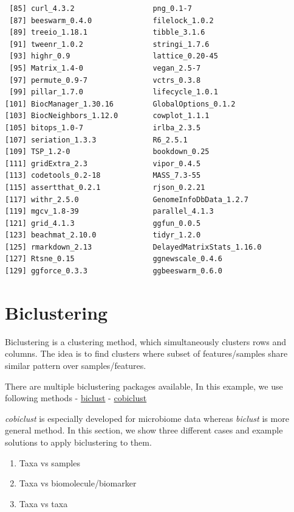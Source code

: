 \documentclass[
]{book}
\providecommand{\tightlist}{%
  \setlength{\itemsep}{0pt}\setlength{\parskip}{0pt}}
\begin{document}
\begin{verbatim}
 [85] curl_4.3.2                  png_0.1-7                  
 [87] beeswarm_0.4.0              filelock_1.0.2             
 [89] treeio_1.18.1               tibble_3.1.6               
 [91] tweenr_1.0.2                stringi_1.7.6              
 [93] highr_0.9                   lattice_0.20-45            
 [95] Matrix_1.4-0                vegan_2.5-7                
 [97] permute_0.9-7               vctrs_0.3.8                
 [99] pillar_1.7.0                lifecycle_1.0.1            
[101] BiocManager_1.30.16         GlobalOptions_0.1.2        
[103] BiocNeighbors_1.12.0        cowplot_1.1.1              
[105] bitops_1.0-7                irlba_2.3.5                
[107] seriation_1.3.3             R6_2.5.1                   
[109] TSP_1.2-0                   bookdown_0.25              
[111] gridExtra_2.3               vipor_0.4.5                
[113] codetools_0.2-18            MASS_7.3-55                
[115] assertthat_0.2.1            rjson_0.2.21               
[117] withr_2.5.0                 GenomeInfoDbData_1.2.7     
[119] mgcv_1.8-39                 parallel_4.1.3             
[121] grid_4.1.3                  ggfun_0.0.5                
[123] beachmat_2.10.0             tidyr_1.2.0                
[125] rmarkdown_2.13              DelayedMatrixStats_1.16.0  
[127] Rtsne_0.15                  ggnewscale_0.4.6           
[129] ggforce_0.3.3               ggbeeswarm_0.6.0           
\end{verbatim}

\hypertarget{biclustering}{%
\chapter{Biclustering}\label{biclustering}}

Biclustering is a clustering method, which simultaneously clusters rows and columns.
The idea is to find clusters where subset of features/samples share similar pattern
over samples/features.

There are multiple biclustering packages available, In this example, we use following methods
- \href{https://cran.r-project.org/web/packages/biclust/index.html}{biclust}
- \href{https://besjournals.onlinelibrary.wiley.com/doi/abs/10.1111/2041-210X.13582}{cobiclust}

\emph{cobiclust} is especially developed for microbiome data whereas \emph{biclust} is more
general method. In this section, we show three different cases and example
solutions to apply biclustering to them.

\begin{enumerate}
\def\labelenumi{\arabic{enumi}.}
\tightlist
\item
  Taxa vs samples
\item
  Taxa vs biomolecule/biomarker
\item
  Taxa vs taxa
\end{enumerate}
\end{document}

